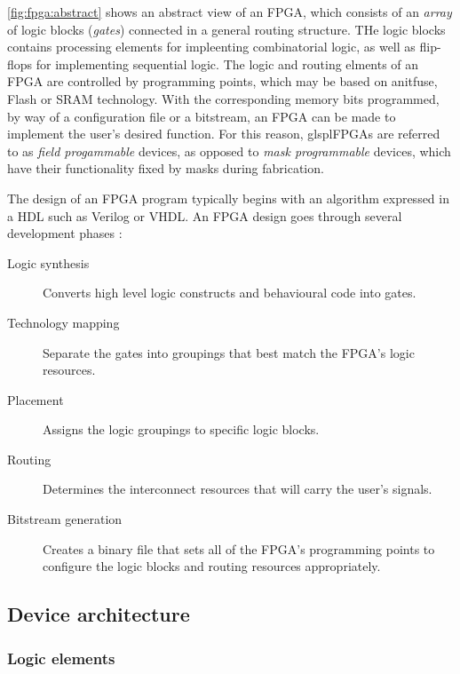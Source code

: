 \autoref{fig:fpga:abstract} shows an abstract view of an \gls{FPGA}, which
consists of an \emph{array} of logic blocks (\emph{gates}) connected in a
general routing structure. THe logic blocks contains processing elements for
impleenting combinatorial logic, as well as flip-flops for implementing
sequential logic. The logic and routing elments of an \gls{FPGA} are controlled
by programming points, which may be based on anitfuse, Flash  or \gls{SRAM}
technology. With the corresponding memory bits programmed, by way of a
configuration file or a bitstream, an \gls{FPGA} can be made to implement the
user's desired function. For this reason, glspl{FPGAs} are referred to as
\emph{field progammable} devices, as opposed to \emph{mask programmable}
devices, which have their  functionality fixed by masks during fabrication.

The design of an \gls{FPGA} program typically begins with an algorithm expressed
in a \gls{HDL} such as Verilog or \gls{VHDL}. An \gls{FPGA} design goes through
several development phases \cite{Hauck:2007}:
\begin{description}
    \item[Logic synthesis] Converts high level logic constructs and behavioural
        code into gates.
    \item[Technology mapping] Separate the gates into groupings that best match
        the \gls{FPGA}'s logic resources.
    \item[Placement] Assigns the logic groupings to specific logic blocks.
    \item[Routing] Determines the interconnect resources that will carry the
        user's signals.
    \item[Bitstream generation] Creates a binary file that sets all of the
        \gls{FPGA}'s programming points to configure the logic blocks and
        routing resources appropriately.
\end{description}

\subsection{Device architecture}
\label{fpga:deviceArchitecture}

\subsubsection{Logic elements}
\label{fpga:deviceArchitecture:logicElements}

